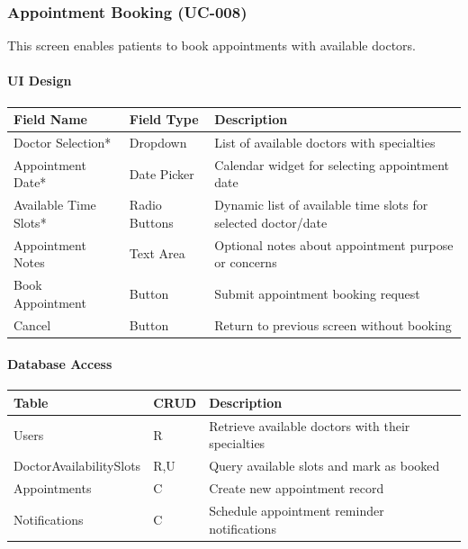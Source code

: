 \documentclass[12pt,a4paper]{article}
\begin{document}
\subsubsection{Appointment Booking (UC-008)}

This screen enables patients to book appointments with available doctors.

\paragraph{UI Design}

\begin{longtable}{|p{3cm}|p{3cm}|p{8cm}|}
\hline
\textbf{Field Name} & \textbf{Field Type} & \textbf{Description} \\
\hline
Doctor Selection* & Dropdown & List of available doctors with specialties \\
\hline
Appointment Date* & Date Picker & Calendar widget for selecting appointment date \\
\hline
Available Time Slots* & Radio Buttons & Dynamic list of available time slots for selected doctor/date \\
\hline
Appointment Notes & Text Area & Optional notes about appointment purpose or concerns \\
\hline
Book Appointment & Button & Submit appointment booking request \\
\hline
Cancel & Button & Return to previous screen without booking \\
\hline
\end{longtable}

\paragraph{Database Access}

\begin{longtable}{|p{3cm}|p{2cm}|p{9cm}|}
\hline
\textbf{Table} & \textbf{CRUD} & \textbf{Description} \\
\hline
Users & R & Retrieve available doctors with their specialties \\
\hline
DoctorAvailabilitySlots & R,U & Query available slots and mark as booked \\
\hline
Appointments & C & Create new appointment record \\
\hline
Notifications & C & Schedule appointment reminder notifications \\
\hline
\end{longtable}
\end{document}
